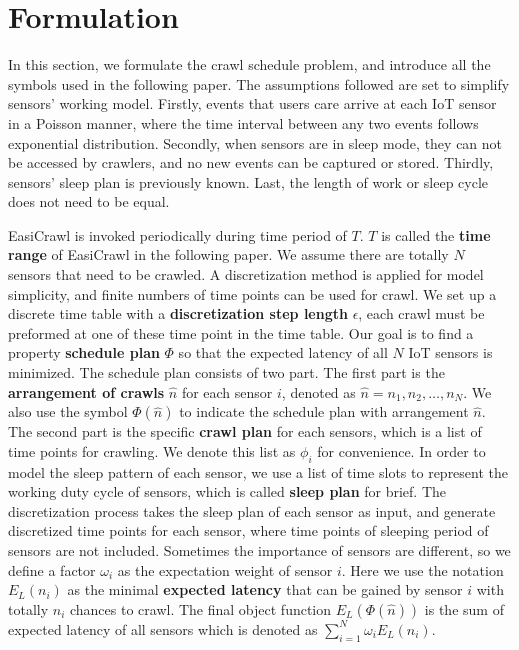 \documentclass[conference]{IEEEtran}
\begin{document}
\section{Formulation}\label{formulation}

In this section, we formulate the crawl schedule problem, and introduce all the symbols used in the following paper. The assumptions followed are set to simplify sensors' working model.
Firstly, events that users care arrive at each IoT sensor in a Poisson manner, where the time interval between any two events follows exponential distribution. 
Secondly, when sensors are in sleep mode, they can not be accessed by crawlers, and no new events can be captured or stored.
Thirdly, sensors' sleep plan is previously known.
Last, the length of work or sleep cycle does not need to be equal.

EasiCrawl is invoked periodically during time period of $T$.
$T$ is called the \textbf{time range} of EasiCrawl in the following paper.
We assume there are totally $N$ sensors that need to be crawled.
A discretization method is applied for model simplicity, and finite numbers of time points can be used for crawl.
We set up a discrete time table with a \textbf{discretization step length} $\epsilon$, each crawl must be preformed at one of these time point in the time table.
Our goal is to find a property \textbf{schedule plan} $\Phi$ so that the expected latency of all $N$ IoT sensors is minimized. 
The schedule plan consists of two part. 
The first part is the \textbf{arrangement of crawls} $\hat{n}$ for each sensor $i$, denoted as $\hat{n}=n_1,n_2,\ldots,n_{N}$. 
We also use the symbol $\Phi(\hat{n})$ to indicate the schedule plan with arrangement $\hat{n}$.
The second part is the specific \textbf{crawl plan} for each sensors, which is a list of time points for crawling. 
We denote this list as $\phi_{i}$ for convenience.
In order to model the sleep pattern of each sensor, we use a list of time slots to represent the working duty cycle of sensors, which is called \textbf{sleep plan} for brief. 
The discretization process takes the sleep plan of each sensor as input, and generate discretized time points for each sensor, where time points of sleeping period of sensors are not included.
Sometimes the importance of sensors are different, so we define a factor $\omega_i$ as the expectation weight of sensor $i$. 
Here we use the notation $E_{L}(n_{i})$ as the minimal \textbf{expected latency} that can be gained by sensor $i$ with totally $n_i$ chances to crawl.
The final object function $E_L(\Phi(\hat{n}))$ is the sum of expected latency of all sensors which is denoted as $\sum_{i=1}^{N} \omega_i E_{L}(n_{i})$.
\end{document}
